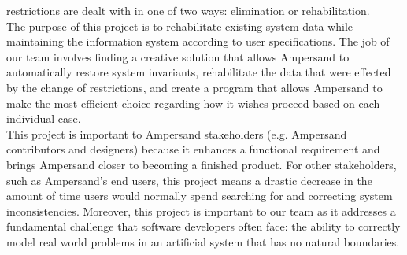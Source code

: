 \documentclass[12pt]{article}
\begin{document}
restrictions are dealt with in one of two ways: elimination or 
rehabilitation.\\ \indent
The purpose of this project is to rehabilitate existing system data while 
maintaining the information system according to user specifications. The job 
of our team involves finding a creative solution that allows Ampersand to 
automatically restore system invariants, rehabilitate the data that were 
effected by the change of restrictions, and create a program that allows 
Ampersand to make the most efficient choice regarding how it wishes proceed 
based on each individual case.\\ \indent
This project is important to Ampersand stakeholders (e.g. Ampersand 
contributors and designers) because it enhances a functional requirement and 
brings Ampersand closer to becoming a finished product. For other stakeholders, 
such as Ampersand's end users, this project means a drastic decrease in the 
amount of time users would normally spend searching for and correcting system
inconsistencies.  Moreover, this project is important to our team as it 
addresses a fundamental challenge that software developers often face: the 
ability to correctly model real world problems in an artificial system that has 
no natural boundaries.
\end{document}
